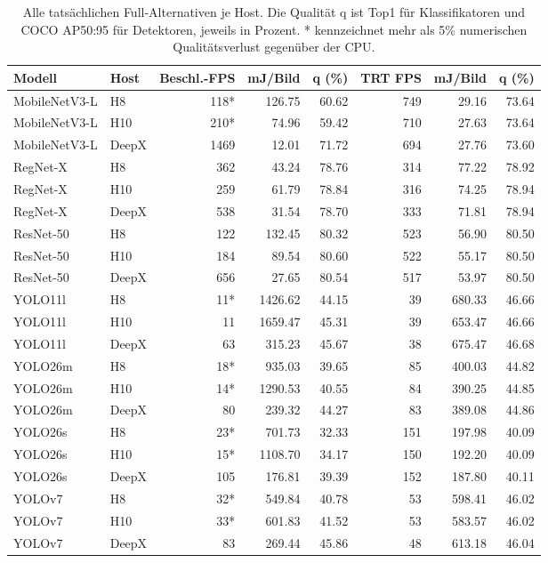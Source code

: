 \begin{table}[t]
\centering
\caption{Alle tatsächlichen Full-Alternativen je Host. Die Qualität q ist Top1 für Klassifikatoren und COCO AP50:95 für Detektoren, jeweils in Prozent. * kennzeichnet mehr als 5\% numerischen Qualitätsverlust gegenüber der CPU.}
\label{tab:current-full-details}
\begingroup\small\setlength{\tabcolsep}{3pt}
\begin{tabular*}{\textwidth}{@{\extracolsep{\fill}}l l r r r r r r@{}}
\toprule
Modell & Host & Beschl.-FPS & mJ/Bild & q (\%) & TRT FPS & mJ/Bild & q (\%) \\
\midrule
MobileNetV3-L & H8 & 118* & 126.75 & 60.62 & 749 & 29.16 & 73.64 \\
MobileNetV3-L & H10 & 210* & 74.96 & 59.42 & 710 & 27.63 & 73.64 \\
MobileNetV3-L & DeepX & 1469 & 12.01 & 71.72 & 694 & 27.76 & 73.60 \\
RegNet-X & H8 & 362 & 43.24 & 78.76 & 314 & 77.22 & 78.92 \\
RegNet-X & H10 & 259 & 61.79 & 78.84 & 316 & 74.25 & 78.94 \\
RegNet-X & DeepX & 538 & 31.54 & 78.70 & 333 & 71.81 & 78.94 \\
ResNet-50 & H8 & 122 & 132.45 & 80.32 & 523 & 56.90 & 80.50 \\
ResNet-50 & H10 & 184 & 89.54 & 80.60 & 522 & 55.17 & 80.50 \\
ResNet-50 & DeepX & 656 & 27.65 & 80.54 & 517 & 53.97 & 80.50 \\
YOLO11l & H8 & 11* & 1426.62 & 44.15 & 39 & 680.33 & 46.66 \\
YOLO11l & H10 & 11 & 1659.47 & 45.31 & 39 & 653.47 & 46.66 \\
YOLO11l & DeepX & 63 & 315.23 & 45.67 & 38 & 675.47 & 46.68 \\
YOLO26m & H8 & 18* & 935.03 & 39.65 & 85 & 400.03 & 44.82 \\
YOLO26m & H10 & 14* & 1290.53 & 40.55 & 84 & 390.25 & 44.85 \\
YOLO26m & DeepX & 80 & 239.32 & 44.27 & 83 & 389.08 & 44.86 \\
YOLO26s & H8 & 23* & 701.73 & 32.33 & 151 & 197.98 & 40.09 \\
YOLO26s & H10 & 15* & 1108.70 & 34.17 & 150 & 192.20 & 40.09 \\
YOLO26s & DeepX & 105 & 176.81 & 39.39 & 152 & 187.80 & 40.11 \\
YOLOv7 & H8 & 32* & 549.84 & 40.78 & 53 & 598.41 & 46.02 \\
YOLOv7 & H10 & 33* & 601.83 & 41.52 & 53 & 583.57 & 46.02 \\
YOLOv7 & DeepX & 83 & 269.44 & 45.86 & 48 & 613.18 & 46.04 \\
\bottomrule
\end{tabular*}
\endgroup
\end{table}
